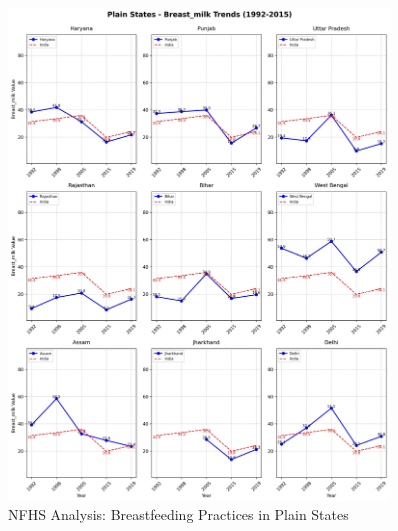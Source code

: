 \begin{figure}[H]
    \centering
    \includegraphics[width=0.9\textwidth]{figures/nfhs/plain_states_breast_milk_subplots.pdf}
    \caption{NFHS Analysis: Breastfeeding Practices in Plain States}
    \label{fig:nfhs_plain_breast_milk}
\end{figure}

